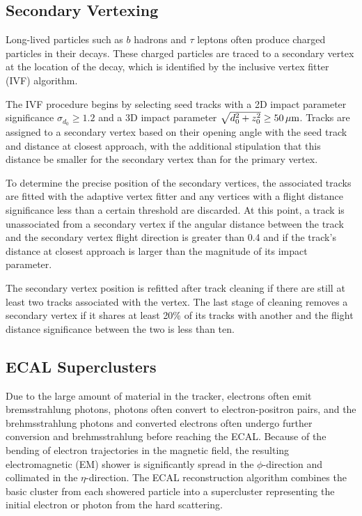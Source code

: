 \subsection{Secondary Vertexing}
\label{sec:pf_csv}


Long-lived particles such as $b$ hadrons and $\tau$ leptons often produce charged particles in their decays.
These charged particles are traced to a secondary vertex at the location of the decay, which is identified by the inclusive vertex fitter (IVF) algorithm.

The IVF procedure begins by selecting seed tracks with a 2D impact parameter significance $\sigma_{d_0} \ge 1.2$ and a 3D impact parameter $\sqrt{d_0^2 + z_0^2} \ge  50\,\mu\text{m}$.
Tracks are assigned to a secondary vertex based on their opening angle with the seed track and distance at closest approach, with the additional stipulation that this distance be smaller for the secondary vertex than for the primary vertex.

To determine the precise position of the secondary vertices, the associated tracks are fitted with the adaptive vertex fitter and any vertices with a flight distance significance less than a certain threshold are discarded.
At this point, a track is unassociated from a secondary vertex if the angular distance between the track and the secondary vertex flight direction is greater than 0.4 and if the track's distance at closest approach is larger than the magnitude of its impact parameter.

The secondary vertex position is refitted after track cleaning if there are still at least two tracks associated with the vertex.
The last stage of cleaning removes a secondary vertex if it shares at least 20\% of its tracks with another and the flight distance significance between the two is less than ten.

\subsection{ECAL Superclusters}
\label{sec:pf_sc}

Due to the large amount of material in the tracker, electrons often emit bremsstrahlung photons, photons often convert to electron-positron pairs, and the brehmsstrahlung photons and converted electrons often undergo further conversion and brehmsstrahlung before reaching the ECAL.
Because of the bending of electron trajectories in the magnetic field, the resulting electromagnetic (EM) shower is significantly spread in the $\phi$-direction and collimated in the $\eta$-direction.
The ECAL reconstruction algorithm combines the basic cluster from each showered particle into a supercluster representing the initial electron or photon from the hard scattering. 

